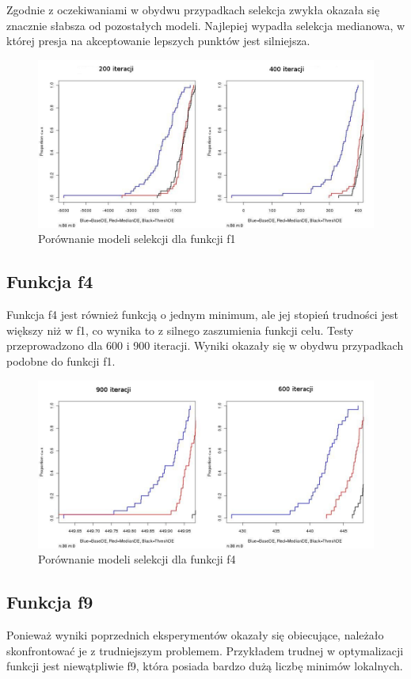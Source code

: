 \documentclass[11pt]{article}
\begin{document}
Zgodnie z oczekiwaniami w obydwu przypadkach selekcja zwykła okazała się znacznie słabsza od pozostałych modeli.
Najlepiej wypadła selekcja medianowa, w której presja na akceptowanie lepszych punktów jest silniejsza.

\begin{figure}[ht]
\centering
\includegraphics[width=140mm]{cec2005_1.jpg}
\caption{Porównanie modeli selekcji dla funkcji f1}
\label{overflow}
\end{figure}

\subsection{Funkcja f4}
Funkcja f4 jest również funkcją o jednym minimum, ale jej stopień trudności jest większy niż w f1, co wynika to z silnego zaszumienia funkcji celu.
Testy przeprowadzono dla 600 i 900 iteracji.
Wyniki okazały się w obydwu przypadkach podobne do funkcji f1.

\begin{figure}[ht]
\centering
\includegraphics[width=140mm]{cec2005_4.jpg}
\caption{Porównanie modeli selekcji dla funkcji f4}
\label{overflow}
\end{figure}

\subsection{Funkcja f9}
Ponieważ wyniki poprzednich eksperymentów okazały się obiecujące, należało skonfrontować je z trudniejszym problemem.
Przykładem trudnej w optymalizacji funkcji jest niewątpliwie f9, która posiada bardzo dużą liczbę minimów lokalnych.
\end{document}
